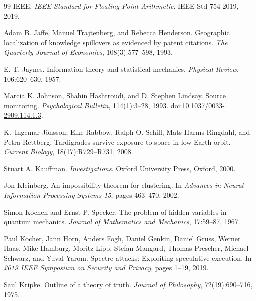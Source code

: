 \documentclass[11pt,a4paper]{article}
\theoremstyle{remark}\newtheorem{remark}[definition]{Remark}
\begin{document}
\begin{thebibliography}{99}
IEEE.
\newblock \emph{IEEE Standard for Floating-Point Arithmetic}.
\newblock IEEE Std 754-2019, 2019.

Adam B. Jaffe, Manuel Trajtenberg, and Rebecca Henderson.
\newblock Geographic localization of knowledge spillovers as evidenced by patent citations.
\newblock \emph{The Quarterly Journal of Economics}, 108(3):577--598, 1993.

E. T. Jaynes.
\newblock Information theory and statistical mechanics.
\newblock \emph{Physical Review}, 106:620--630, 1957.

Marcia K. Johnson, Shahin Hashtroudi, and D. Stephen Lindsay.
\newblock Source monitoring.
\newblock \emph{Psychological Bulletin}, 114(1):3--28, 1993.
\newblock \href{https://doi.org/10.1037/0033-2909.114.1.3}{doi:10.1037/0033-2909.114.1.3}.

K.~Ingemar J\"onsson, Elke Rabbow, Ralph O. Schill, Mats Harms-Ringdahl, and Petra Rettberg.
\newblock Tardigrades survive exposure to space in low Earth orbit.
\newblock \emph{Current Biology}, 18(17):R729--R731, 2008.

Stuart A. Kauffman.
\newblock \emph{Investigations}.
\newblock Oxford University Press, Oxford, 2000.

Jon Kleinberg.
\newblock An impossibility theorem for clustering.
\newblock In \emph{Advances in Neural Information Processing Systems 15}, pages 463--470, 2002.

Simon Kochen and Ernst P. Specker.
\newblock The problem of hidden variables in quantum mechanics.
\newblock \emph{Journal of Mathematics and Mechanics}, 17:59--87, 1967.

Paul Kocher, Jann Horn, Anders Fogh, Daniel Genkin, Daniel Gruss, Werner Haas, Mike Hamburg, Moritz Lipp, Stefan Mangard, Thomas Prescher, Michael Schwarz, and Yuval Yarom.
\newblock Spectre attacks: Exploiting speculative execution.
\newblock In \emph{2019 IEEE Symposium on Security and Privacy}, pages 1--19, 2019.

Saul Kripke.
\newblock Outline of a theory of truth.
\newblock \emph{Journal of Philosophy}, 72(19):690--716, 1975.


\end{thebibliography}
\end{document}
